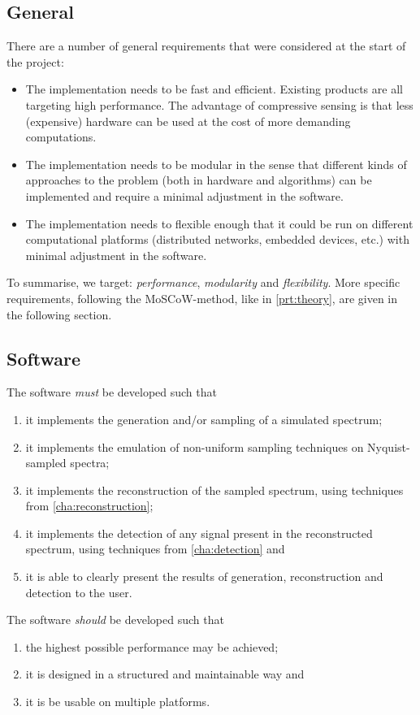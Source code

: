 \documentclass[a4paper, openany, oneside]{memoir}
\begin{document}
\subsection{General}
There are a number of general requirements that were considered at the start of the project:
\begin{itemize}
    \item The implementation needs to be fast and efficient. Existing products are all targeting high performance. The advantage of compressive sensing is that less (expensive) hardware can be used at the cost of more demanding computations.
    \item The implementation needs to be modular in the sense that different kinds of approaches to the problem (both in hardware and algorithms) can be implemented and require a minimal adjustment in the software.
    \item The implementation needs to flexible enough that it could be run on different computational platforms (distributed networks, embedded devices, etc.) with minimal adjustment in the software.
\end{itemize}

To summarise, we target: \emph{performance}, \emph{modularity} and \emph{flexibility}. More specific requirements, following the MoSCoW-method, like in \cref{prt:theory}, are given in the following section.

\subsection{Software}
The software \emph{must} be developed such that
\begin{enumerate}
    \item it implements the generation and/or sampling of a simulated spectrum;
    \item it implements the emulation of non-uniform sampling techniques on Nyquist-sampled spectra;
    \item it implements the reconstruction of the sampled spectrum, using techniques from \cref{cha:reconstruction};
    \item it implements the detection of any signal present in the reconstructed spectrum, using techniques from \cref{cha:detection} and
    \item it is able to clearly present the results of generation, reconstruction and detection to the user.
\end{enumerate}
The software \emph{should} be developed such that
\begin{enumerate}
    \item the highest possible performance may be achieved;
    \item it is designed in a structured and maintainable way and
    \item it is be usable on multiple platforms.
\end{enumerate}
\end{document}
